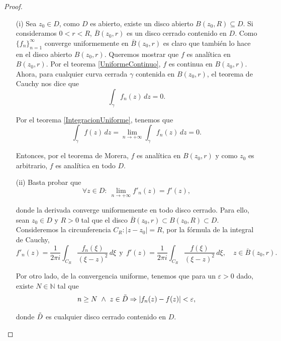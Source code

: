 \begin{proof}
\ 

\begin{itemize}
    \item[(i)] Sea $z_0 \in D$, como $D$ es abierto, existe un disco abierto $B(z_0,R) \subseteq D$. Si consideramos $0 < r < R$, $\overline{B}(z_0,r)$ es un disco cerrado contenido en $D$. Como $\{f_n\}_{n=1}^{\infty}$ converge uniformemente en $\overline{B}(z_0,r)$ es claro que también lo hace en el disco abierto $B(z_0,r)$. Queremos mostrar que $f$ es analítica en $B(z_0,r)$. Por el teorema \ref{UniformeContinuo}, $f$ es continua en $B(z_0,r)$. Ahora, para  cualquier curva cerrada $\gamma$ contenida en $B(z_0,r)$, el teorema de Cauchy nos dice que
    $$\int_{\gamma} f_n(z) \,dz = 0.$$
    
  Por el teorema \ref{IntegracionUniforme}, tenemos que $$\int_{\gamma} f(z) \,dz = \lim_{n\to + \infty} \int_{\gamma} f_n(z) \,dz = 0.$$
    
    Entonces, por el teorema de Morera, $f$ es analítica en $B(z_0,r)$ y como $z_0$ es arbitrario, $f$ es analítica en todo $D$.
    
    \item[(ii)] Basta probar que 
    \begin{equation}
      \forall z \in D:~ \lim_{n \to + \infty} f'_n(z) = f'(z),  \label{DerivadaUniforme0}
    \end{equation}

    donde la derivada converge uniformemente en todo disco cerrado. Para ello, sean $z_0 \in D$ y $R > 0$ tal que el disco $\overline{B}(z_0,r) \subset B(z_0,R) \subset D$. Consideremos la circunferencia $C_R: |z-z_0| = R$, por la fórmula de la integral de Cauchy,
    \begin{equation}
      f'_n(z) = \frac{1}{2\pi i} \int_{C_R} \frac{f_n(\xi)}{(\xi-z)^2} \,d\xi ~~\mbox{y}~~ f'(z) = \frac{1}{2\pi i} \int_{C_R}\frac{f(\xi)}{(\xi-z)^2} \,d\xi, \quad z \in \overline{B}(z_0,r). \label{DerivadaUniforme1}
    \end{equation}
    
    Por otro lado, de la convergencia uniforme, tenemos que para un $\varepsilon > 0$ dado, existe $N \in \mathbb{N}$ tal que
    \begin{equation}
       n \geq N ~\wedge~  z \in \Tilde{D} \Rightarrow |f_n(z) - f(z)| < \varepsilon, \label{DerivadaUniforme2}
    \end{equation}
    
    donde $\Tilde{D}$ es cualquier disco cerrado contenido en $D$.
    

\end{itemize}
\end{proof}
